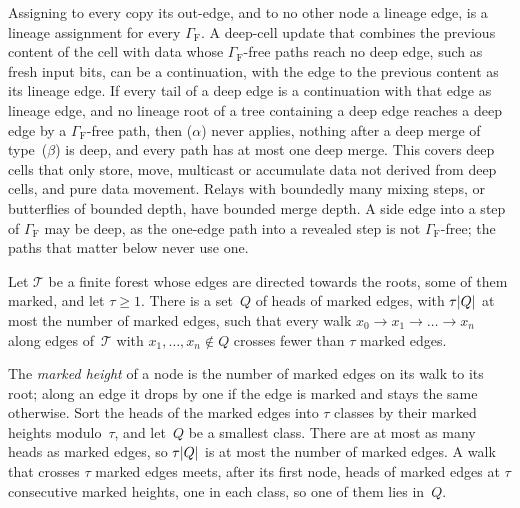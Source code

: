 \begin{remark}[Examples]\label{rem:hop-examples}
Assigning to every copy its out-edge, and to no other node a lineage edge, is a lineage assignment for every
$\Gamma_{\mathrm F}$. A deep-cell update that combines the previous content of the cell with data whose
$\Gamma_{\mathrm F}$-free paths reach no deep edge, such as fresh input bits, can be a continuation, with the edge to the
previous content as its lineage edge. If every tail of a deep edge is a continuation with that edge as lineage edge, and
no lineage root of a tree containing a deep edge reaches a deep edge by a $\Gamma_{\mathrm F}$-free path, then
($\alpha$) never applies, nothing after a deep merge of type~($\beta$) is deep, and every path has at most one deep
merge. This covers deep cells that only store, move, multicast or accumulate data not derived from deep cells, and pure
data movement. Relays with boundedly many mixing steps, or butterflies of bounded depth, have bounded merge depth. A
side edge into a step of $\Gamma_{\mathrm F}$ may be deep, as the one-edge path into a revealed step is not
$\Gamma_{\mathrm F}$-free; the paths that matter below never use one.
\end{remark}

\begin{lemma}[Covering]\label{lem:covering}
Let $\mathcal T$ be a finite forest whose edges are directed towards the roots, some of them marked, and let $\tau\ge1$.
There is a set~$Q$ of heads of marked edges, with $\tau\lvert Q \rvert$ at most the number of marked edges, such that every walk
$x_0\to x_1\to\dots\to x_n$ along edges of~$\mathcal T$ with $x_1,\dots,x_n\notin Q$ crosses fewer than $\tau$ marked
edges.
\end{lemma}

\begin{outline}
The \emph{marked height} of a node is the number of marked edges on its walk to its root; along an edge it drops by one
if the edge is marked and stays the same otherwise. Sort the heads of the marked edges into $\tau$ classes by their
marked heights modulo~$\tau$, and let~$Q$ be a smallest class. There are at most as many heads as marked edges, so
$\tau\lvert Q \rvert$ is at most the number of marked edges. A walk that crosses $\tau$ marked edges meets, after its first
node, heads of marked edges at $\tau$ consecutive marked heights, one in each class, so one of them lies in~$Q$.
\end{outline}

